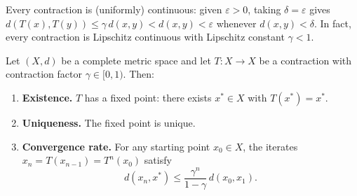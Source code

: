 \documentclass[11pt,a4paper]{article}
\begin{document}
\begin{remark}
\label{rem:contraction_continuous}
Every contraction is (uniformly) continuous: given $\varepsilon > 0$,
taking $\delta = \varepsilon$ gives $d(T(x), T(y)) \le \gamma\,d(x,y)
< d(x,y) < \varepsilon$ whenever $d(x,y) < \delta$. In fact, every
contraction is Lipschitz continuous with Lipschitz constant $\gamma < 1$.
\end{remark}

\begin{keyresult}[title={Banach Fixed-Point Theorem}]
\begin{theorem}
\label{thm:banach}
Let $(X, d)$ be a complete metric space and let $T \colon X \to X$ be a
contraction with contraction factor $\gamma \in [0, 1)$. Then:
\begin{enumerate}[nosep,label=(\roman*)]
  \item \textbf{Existence.} $T$ has a fixed point: there exists
    $x^* \in X$ with $T(x^*) = x^*$.
  \item \textbf{Uniqueness.} The fixed point is unique.
  \item \textbf{Convergence rate.} For any starting point $x_0 \in X$,
    the iterates $x_n = T(x_{n-1}) = T^n(x_0)$ satisfy
    \[
      d(x_n, x^*) \le \frac{\gamma^n}{1 - \gamma}\, d(x_0, x_1).
    \]
\end{enumerate}
\end{theorem}
\end{keyresult}
\end{document}
